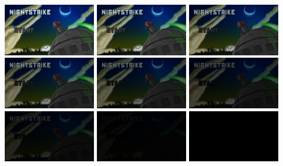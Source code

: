 \documentclass[10pt]{book}
\begin{document}
\begin{center}
\includegraphics[width=0.3\textwidth]{fade/0.png}
\includegraphics[width=0.3\textwidth]{fade/1.png}
\includegraphics[width=0.3\textwidth]{fade/2.png}
\includegraphics[width=0.3\textwidth]{fade/3.png}
\includegraphics[width=0.3\textwidth]{fade/4.png}
\includegraphics[width=0.3\textwidth]{fade/5.png}
\includegraphics[width=0.3\textwidth]{fade/6.png}
\includegraphics[width=0.3\textwidth]{fade/7.png}
\includegraphics[width=0.3\textwidth]{fade/8.png}
\end{center}
\end{document}
